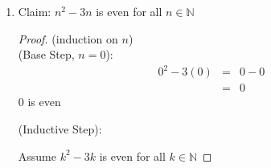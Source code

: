 \documentclass{article}
\begin{document}
\begin{enumerate}
\begin{enumerate}
        \begin{proof}
            (induction on $n$) \\
            (Base Step, $n=2$):
            \begin{eqnarray}
                3^2 &=& 9 \\
                &>& 4 \\
                &=& 2^2
            \end{eqnarray}
            (Inductive Step): \\
            Assume $3^k > k^2$ for some $k \geq 2$
            \begin{eqnarray}
                3^{k+1} &=& 3^k \cdot 3 \\
                &>& k^2 \cdot 3 \hspace{1cm} \text{(by the induction hypothesis)} \\
                &=& k^2 + k^2 + k^2 \\
                &\geq& k^2 + 2k + 1 \hspace{1cm} \text{($k^2 \geq 2k > 1$ for all $k \geq 2$)}\\
                &=& (k+1)(k+1) \\
                &=& (k+1)^2
            \end{eqnarray}
        \end{proof}
        \item Claim: $n^2 -3n$ is even for all $n \in \mathbb{N}$
        \begin{proof}
            (induction on $n$) \\
            (Base Step, $n = 0$):
            \begin{eqnarray}
                0^2 - 3(0) &=& 0 - 0 \\
                &=& 0
            \end{eqnarray}
            \hspace{1cm} $0$ is even

            (Inductive Step): 

            \hspace{1cm} Assume $k^2 -3k$ is even for all $k \in \mathbb{N}$ 


\end{proof}
\end{enumerate}
\end{enumerate}
\end{document}
